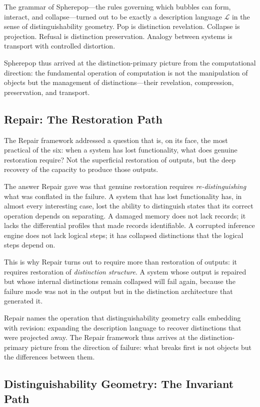 \documentclass[12pt, letterpaper]{article}
\theoremstyle{remark}
\begin{document}
The grammar of Spherepop---the rules governing which bubbles can form,
interact, and collapse---turned out to be exactly a description language
$\mathcal{L}$ in the sense of distinguishability geometry.  Pop is distinction
revelation.  Collapse is projection.  Refusal is distinction preservation.
Analogy between systems is transport with controlled distortion.

Spherepop thus arrived at the distinction-primary picture from the
computational direction: the fundamental operation of computation is not
the manipulation of objects but the management of distinctions---their
revelation, compression, preservation, and transport.

\subsection{Repair: The Restoration Path}

The Repair framework addressed a question that is, on its face, the most
practical of the six: when a system has lost functionality, what does
genuine restoration require?  Not the superficial restoration of outputs,
but the deep recovery of the capacity to produce those outputs.

The answer Repair gave was that genuine restoration requires
\emph{re-distinguishing} what was conflated in the failure.  A system that
has lost functionality has, in almost every interesting case, lost the
ability to distinguish states that its correct operation depends on
separating.  A damaged memory does not lack records; it lacks the
differential profiles that made records identifiable.  A corrupted
inference engine does not lack logical steps; it has collapsed distinctions
that the logical steps depend on.

This is why Repair turns out to require more than restoration of outputs:
it requires restoration of \emph{distinction structure}.  A system whose
output is repaired but whose internal distinctions remain collapsed will
fail again, because the failure mode was not in the output but in the
distinction architecture that generated it.

Repair names the operation that distinguishability geometry calls embedding
with revision: expanding the description language to recover distinctions
that were projected away.  The Repair framework thus arrives at the
distinction-primary picture from the direction of failure: what breaks
first is not objects but the differences between them.

\subsection{Distinguishability Geometry: The Invariant Path}
\end{document}

